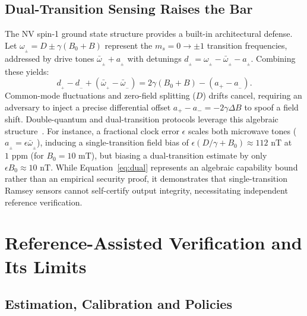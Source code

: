 \documentclass[conference]{IEEEtran}
\begin{document}
\subsection{Dual-Transition Sensing Raises the Bar}

The NV spin-1 ground state structure provides a built-in architectural defense. Let $\omega_{_\pm} = D \pm \gamma(B_0 + B)$ represent the $m_s = 0 \to \pm 1$ transition frequencies, addressed by drive tones $\bar\omega_{_\pm} + a_{_\pm}$ with detunings $d_{_\pm} = \omega_{_\pm} - \bar\omega_{_\pm} - a_{_\pm}$. Combining these yields:
\begin{equation}
 d_{_+}-d_{_-}+(\bar\omega_{_+}-\bar\omega_{_-})=2\gamma(B_0+B)-(a{_+}-a_{_-}).
 \label{eq:dual}
\end{equation}
Common-mode fluctuations and zero-field splitting ($D$) drifts cancel, requiring an adversary to inject a precise differential offset $a_+ - a_- = -2\gamma\Delta B$ to spoof a field shift. Double-quantum and dual-transition protocols leverage this algebraic structure~\cite{fang2013quantumbeats,bauch2018ultralong,hart2021dq}. For instance, a fractional clock error $\epsilon$ scales both microwave tones ($a_{_\pm} = \epsilon\bar\omega_{_\pm}$), inducing a single-transition field bias of $\epsilon(D/\gamma + B_0) \approx 112\text{~nT}$ at $1\text{~ppm}$ (for $B_0 = 10\text{~mT}$), but biasing a dual-transition estimate by only $\epsilon B_0 \approx 10\text{~nT}$. While Equation~\eqref{eq:dual} represents an algebraic capability bound rather than an empirical security proof, it demonstrates that single-transition Ramsey sensors cannot self-certify output integrity, necessitating independent reference verification.

\section{Reference-Assisted Verification and Its Limits}
\label{sec:reference}

\subsection{Estimation, Calibration and Policies}
\end{document}
